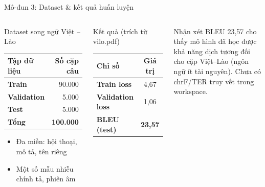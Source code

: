 ﻿\documentclass[aspectratio=169, 11pt]{beamer}
\begin{document}
\begin{frame}{Mô-đun 3: Dataset \& kết quả huấn luyện}
    \begin{columns}[T]
        \begin{block}{Dataset song ngữ Việt -- Lào}
            \begin{tabular}{>{\small\bfseries}l >{\small}r}
                \toprule
                Tập dữ liệu & Số cặp câu \\
                \midrule
                Train & 90.000 \\
                Validation & 5.000 \\
                Test & 5.000 \\
                \midrule
                \textbf{Tổng} & \textbf{100.000} \\
                \bottomrule
            \end{tabular}
            \vspace{0.15cm}
            \begin{itemize}\scriptsize
                \item Đa miền: hội thoại, mô tả, tên riêng
                \item Một số mẫu nhiễu chính tả, phiên âm
            \end{itemize}
        \end{block}

        \begin{block}{Kết quả (trích từ vilo.pdf)}
            \centering
            \begin{tabular}{>{\small\bfseries}l >{\small}c}
                \toprule
                Chỉ số & Giá trị \\
                \midrule
                Train loss & 4,67 \\
                Validation loss & 1,06 \\
                BLEU (test) & \textbf{23,57} \\
                \bottomrule
            \end{tabular}
        \end{block}
        \vspace{0.15cm}
        \begin{alertblock}{\small Nhận xét}
            \scriptsize BLEU 23,57 cho thấy mô hình đã học được khả năng dịch tương đối cho cặp Việt--Lào (ngôn ngữ ít tài nguyên). Chưa có chrF/TER truy vết trong workspace.
        \end{alertblock}
    \end{columns}
\end{frame}
\end{document}
